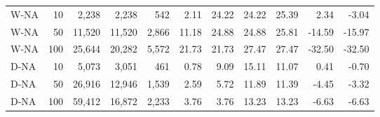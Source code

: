 \begin{table}[htbp]
\begin{tabular}{lrrrrrrrrrr}
W-NA & 10 & 2,238 & 2,238 & 542 & 2.11 & 24.22 & 24.22 & 25.39 & 2.34 & -3.04\\
W-NA & 50 & 11,520 & 11,520 & 2,866 & 11.18 & 24.88 & 24.88 & 25.81 & -14.59 & -15.97\\
W-NA & 100 & 25,644 & 20,282 & 5,572 & 21.73 & 21.73 & 27.47 & 27.47 & -32.50 & -32.50\\
D-NA & 10 & 5,073 & 3,051 & 461 & 0.78 & 9.09 & 15.11 & 11.07 & 0.41 & -0.70\\
D-NA & 50 & 26,916 & 12,946 & 1,539 & 2.59 & 5.72 & 11.89 & 11.39 & -4.45 & -3.32\\
D-NA & 100 & 59,412 & 16,872 & 2,233 & 3.76 & 3.76 & 13.23 & 13.23 & -6.63 & -6.63\\
\bottomrule
\end{tabular}
\end{table}
